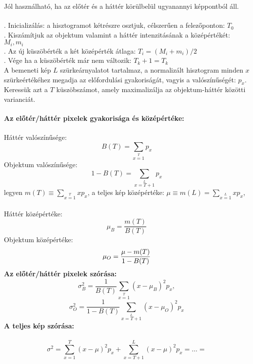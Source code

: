 Jól használható, ha az előtér és a háttér körülbelül ugyanannyi képpontból áll.\\\\
. Inicializálás: a hisztogramot kétrészre osztjuk, célszerűen a felezőponton: $T_0$ \\
. Kiszámítjuk az objektum valamint a háttér intenzitásának a középértékét: $M_i, m_i$\\ 
. Az új küszöbérték a két középérték átlaga: $T_i=(M_i+m_i)/2$ \\
. Vége ha a küszöbérték már nem változik: $T_k+1=T_k$ \\ 
A bemeneti kép $L$ szürkeárnyalatot tartalmaz, a normalizált hisztogram minden $x$ szürkeértékéhez megadja az előfordulási gyakoriságát, vagyis a valószínűségét: $p_x$. Keressük azt a $T$ küszöbszámot, amely maximalizálja az objektum-háttér közötti varianciát.\\\\
\textbf{Az előtér/háttér pixelek gyakorisága és középértéke:}\\\\
\indent Háttér valószínűsége:
\begin{equation*}
B(T)=\sum\limits_{x=1}\limits^{T}p_x 
\end{equation*}
\indent Objektum valószínűsége:
\begin{equation*}
1-B(T)=\sum\limits_{x=T+1}\limits^{L}p_x
\end{equation*}
\indent legyen $m(T)\equiv \sum\limits_{x=1}\limits^{T}xp_x$, a teljes kép középértéke: $\mu \equiv m(L) = \sum\limits_{x=1}\limits^{L}xp_x$,\\ \\
\indent Háttér középértéke:
\begin{equation*}
\mu_B =\frac{m(T)}{B(T)}
\end{equation*}
\indent Objektum középértéke:
\begin{equation*}
\mu_O =\frac{\mu-m(T)}{1-B(T)}\\
\end{equation*}
\textbf{Az előtér/háttér pixelek szórása:}
$$\sigma^2_B=\frac{1}{B(T)}\sum\limits_{x=1}\limits^{T}(x-\mu_B)^2 p_x , $$
$$\sigma^2_O=\frac{1}{1-B(T)}\sum\limits_{x=T+1}\limits^{L}(x-\mu_O)^2 p_x $$
\textbf{A teljes kép szórása:}\\\\
$$\sigma^2=\sum_{x=1}^T(x-\mu)^2 p_x + \sum_{x=T+1}^L(x-\mu)^2 p_x=\dots= $$
